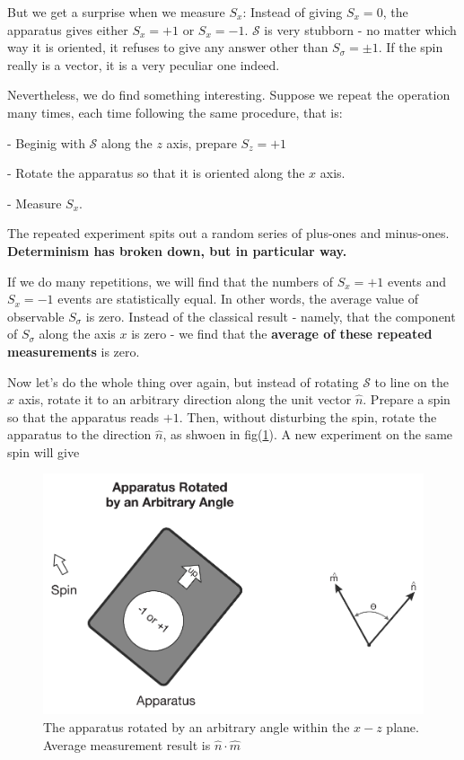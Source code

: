 \documentclass{article}
\begin{document}
But we get a surprise when we measure $S_x$: Instead of giving $S_x = 0$, the apparatus gives either $S_x = +1$ or 
$S_x = -1$. $\mathcal{S}$ is very stubborn - no matter which way it is oriented, it refuses to give any answer other than $S_{\sigma} = \pm 1$. If the spin really is a vector, it is a very peculiar one indeed.


Nevertheless, we do find something interesting. Suppose we repeat the operation many times, each time following the same procedure, that is:

- Beginig with $\mathcal{S}$ along the $z$ axis, prepare $S_z = + 1$

- Rotate the apparatus so that it is oriented along the $x$ axis.

- Measure $S_x$.


The repeated experiment spits out a random series of plus-ones and minus-ones. \textbf{Determinism has broken down, but in particular way.} 

If we do many repetitions, we will find that the numbers of $S_x = + 1$ events and $S_x = - 1$ events are statistically equal. In other words, the average value of observable $S_{\sigma}$ is zero. Instead of the classical result - namely, that the component of $S_{\sigma}$ along the axis $x$ is zero - we find that the \textbf{average of these repeated measurements} is zero.


Now let's do the whole thing over again, but instead of rotating $\mathcal{S}$ to line on the $x$ axis, rotate it to an arbitrary direction along the unit vector $\hat{n}$. Prepare a spin so that the apparatus reads $+1$. Then, without disturbing the spin, rotate the apparatus to the direction $\hat{n}$, as shwoen in fig(\ref{stern_and_gerlach_4_pic}). A new experiment on the same spin will give



\begin{figure}[!htbp]
\centering
\includegraphics[scale=0.4]{stern_and_gerlach_4}
\caption{The apparatus rotated by an arbitrary angle within the $x-z$ plane. Average measurement result is $\hat{n} \cdot \hat{m}$}\label{stern_and_gerlach_4_pic}
\end{figure}
\end{document}
